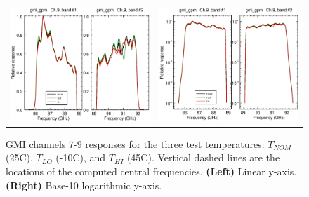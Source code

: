 \begin{figure}[H]
\begin{tabular}{c c}
    \includegraphics[scale=0.35]{graphics/lin/gmi_gpm-9.eps} &
    \includegraphics[scale=0.35]{graphics/log/gmi_gpm-9.eps}
  \end{tabular}
  \caption{GMI channels 7-9 responses for the three test temperatures: $T_{NOM}$ (25\textdegree{}C), $T_{LO}$ (-10\textdegree{}C), and $T_{HI}$ (45\textdegree{}C). Vertical dashed lines are the locations of the computed central frequencies. \textbf{(Left)} Linear y-axis. \textbf{(Right)} Base-10 logarithmic y-axis.}
  \label{fig:ch7-9_response}
\end{figure}

